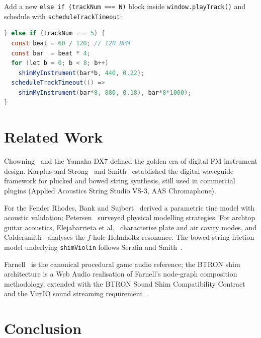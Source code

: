 \documentclass[10pt,journal,compsoc,twocolumn]{article}
\begin{document}
Add a new \texttt{else if (trackNum === N)} block inside
\texttt{window.playTrack()} and schedule with
\texttt{scheduleTrackTimeout}:

\begin{lstlisting}[language=Java,
    caption={Tracker integration for a new shim.}]
} else if (trackNum === 5) {
  const beat = 60 / 120; // 120 BPM
  const bar  = beat * 4;
  for (let b = 0; b < 8; b++)
    shimMyInstrument(bar*b, 440, 0.22);
  scheduleTrackTimeout(() =>
    shimMyInstrument(bar*8, 880, 0.18), bar*8*1000);
}
\end{lstlisting}

\section{Related Work}
\label{sec:related}

Chowning~\cite{chowning1973synthesis} and the Yamaha DX7 defined the golden era
of digital FM instrument design.  Karplus and Strong~\cite{karplus1983digital}
and Smith~\cite{smith1992physical,smith2010physical} established the digital
waveguide framework for plucked and bowed string synthesis, still used in
commercial plugins (Applied Acoustics String Studio VS-3, AAS Chromaphone).

For the Fender Rhodes, Bank and Sujbert~\cite{bank2010parametric} derived a
parametric tine model with acoustic validation; Petersen~\cite{petersen2011rhodes}
surveyed physical modelling strategies.  For archtop guitar acoustics,
Elejabarrieta et al.~\cite{Elejabarrieta2002guitar} characterise plate and air
cavity modes, and Caldersmith~\cite{Caldersmith1978guitar} analyses
the $f$-hole Helmholtz resonance.  The bowed string friction model underlying
\texttt{shimViolin} follows Serafin and
Smith~\cite{serafin2004bowed}.

Farnell~\cite{farnell2010designing} is the canonical procedural game audio
reference; the BTRON shim architecture is a Web Audio realisation of Farnell's
node-graph composition methodology, extended with the BTRON Sound Shim
Compatibility Contract and the VirtIO sound streaming
requirement~\cite{lilcu64spec}.

\section{Conclusion}
\label{sec:conclusion}
\end{document}
